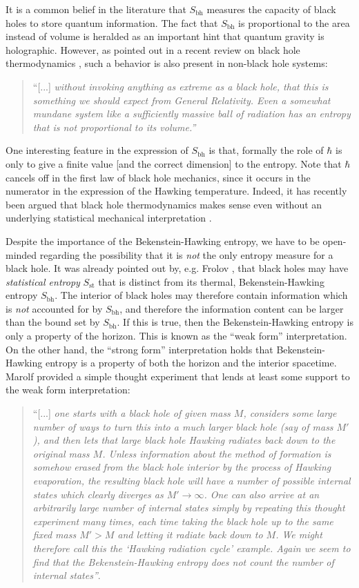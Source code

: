 \documentclass[12pt]{article}
\newcommand{\2}{$^2$}
\newcommand{\3}{$^3$}
\newcommand{\4}{$_4$}
\newcommand{\5}{$_5$}
\begin{document}
It is a common belief in the literature that $S_{\text{bh}}$ measures the capacity of black holes to store quantum information. The fact that $S_{\text{bh}}$ is proportional to the area instead of volume is heralded as an important hint that quantum gravity is holographic. However, as pointed out in a recent review on black hole thermodynamics \cite{1402.5127}, such a behavior is also present in non-black hole systems:
\begin{quote}
``[...] \emph{without invoking anything as extreme as a black hole, that this is
something we should expect from General Relativity. Even a somewhat mundane
system like a sufficiently massive ball of radiation has an entropy that is not proportional
to its volume.''}
\end{quote}
One interesting feature in the expression of $S_{\text{bh}}$ is that, formally the role of $\hbar$ is only to give a finite value [and the correct dimension] to the entropy. Note that $\hbar$ cancels off in the first law of black hole mechanics, since it occurs in the numerator in the expression of the Hawking temperature. Indeed, it has recently been argued that black hole thermodynamics makes sense even without an underlying statistical mechanical interpretation \cite{curiel2}.

Despite the importance of the Bekenstein-Hawking entropy, we have to be open-minded regarding the possibility that it is \emph{not} the only entropy measure for a black hole. It was already pointed out by, e.g. Frolov \cite{facade}, that black holes may have \emph{statistical entropy} $S_{\text{st}}$ that is distinct from its thermal, Bekenstein-Hawking entropy $S_{\text{bh}}$. The interior of black holes may therefore contain information which is \emph{not} accounted for by $S_{\text{bh}}$, and therefore the information content can be larger than the bound set by $S_{\text{bh}}$. If this is true, then the Bekenstein-Hawking entropy is only a property of the horizon. This is known as the ``weak form'' interpretation. On the other hand, the ``strong form'' interpretation holds that Bekenstein-Hawking entropy is a property of both the horizon and the interior spacetime. Marolf \cite{marolf} provided a simple thought experiment that lends at least some support to the weak form interpretation:
\begin{quote}
``[...] \emph{one starts with a black hole of given mass $M$, considers some large
number of ways to turn this into a much larger black hole (say of mass $M'$), and then lets
that large black hole Hawking radiates back down to the original mass $M$. Unless information
about the method of formation is somehow erased from the black hole interior by the process
of Hawking evaporation, the resulting black hole will have a number of possible internal states
which clearly diverges as $M' \to \infty$. One can also arrive at an arbitrarily large number of
internal states simply by repeating this thought experiment many times, each time taking
the black hole up to the same fixed mass $M' > M$ and letting it radiate back down to $M$.
We might therefore call this the ‘Hawking radiation cycle’ example. Again we seem to find
that the Bekenstein-Hawking entropy does not count the number of internal states''}.
\end{quote}
\end{document}
